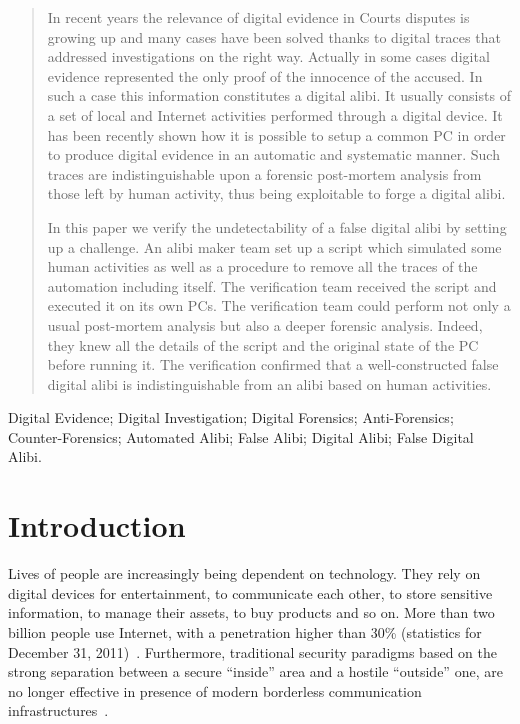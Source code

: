 \documentclass[10pt, conference]{IEEEtran}
\begin{document}
\begin{abstract}

In recent years the relevance of digital evidence in Courts disputes is growing up and many cases have been solved thanks to digital
traces that addressed investigations on the right way. Actually in some cases digital evidence represented the only proof of the
innocence of the accused. In such a case this information constitutes a digital alibi. It usually consists of a set of local and Internet
activities performed through a digital device.
It has been recently shown how it is possible to setup a common PC in order to produce digital evidence in an automatic and
systematic manner. Such traces are indistinguishable upon a forensic post-mortem analysis from those left by human activity,
thus being exploitable to forge a digital alibi.

In this paper we verify the undetectability of a false digital alibi by setting up a challenge. An alibi maker team set up a script which
simulated some human activities as well as a procedure to remove all the traces of the automation including itself. The verification
team received the script and executed it on its own PCs. The verification team could perform not only a usual post-mortem analysis
but also a deeper forensic analysis. Indeed, they knew all the details of the script and the original state of the PC before running it.
The verification confirmed that a well-constructed false digital alibi is indistinguishable from an alibi based on human activities.

\end{abstract}

\begin{IEEEkeywords}
 Digital Evidence; Digital Investigation; Digital Forensics; Anti-Forensics; Counter-Forensics;
 Automated Alibi; False Alibi; Digital Alibi; False Digital Alibi.
\end{IEEEkeywords}


\section{Introduction}
Lives of people are increasingly being dependent on technology. They rely on digital devices for entertainment, to communicate each
other, to store sensitive information, to manage their assets, to buy products and so on. More than two billion people use Internet,
with a penetration higher than 30\% (statistics for December 31, 2011)~\cite{stat}.  
Furthermore, traditional security paradigms based on the strong
separation between a secure  ``inside'' area and a hostile ``outside''
one, are no longer effective in presence of modern borderless
communication infrastructures~\cite{PalmieriFC11}.
\end{document}
